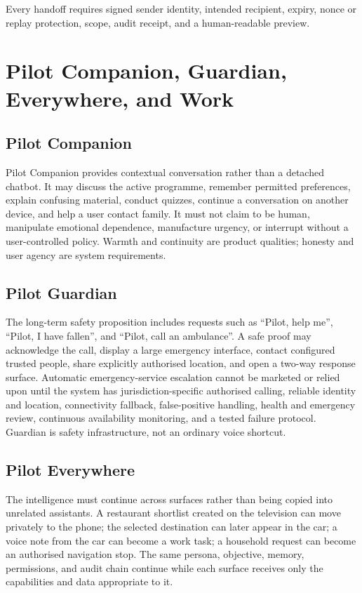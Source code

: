 \documentclass[11pt,a4paper]{article}
\begin{document}
Every handoff requires signed sender identity, intended recipient, expiry,
nonce or replay protection, scope, audit receipt, and a human-readable preview.

\section{Pilot Companion, Guardian, Everywhere, and Work}

\subsection{Pilot Companion}

Pilot Companion provides contextual conversation rather than a detached
chatbot.  It may discuss the active programme, remember permitted preferences,
explain confusing material, conduct quizzes, continue a conversation on
another device, and help a user contact family.  It must not claim to be human,
manipulate emotional dependence, manufacture urgency, or interrupt without a
user-controlled policy.  Warmth and continuity are product qualities; honesty
and user agency are system requirements.

\subsection{Pilot Guardian}

The long-term safety proposition includes requests such as ``Pilot, help me'',
``Pilot, I have fallen'', and ``Pilot, call an ambulance''.  A safe proof may
acknowledge the call, display a large emergency interface, contact configured
trusted people, share explicitly authorised location, and open a two-way
response surface.  Automatic emergency-service escalation cannot be marketed
or relied upon until the system has jurisdiction-specific authorised calling,
reliable identity and location, connectivity fallback, false-positive
handling, health and emergency review, continuous availability monitoring,
and a tested failure protocol.  Guardian is safety infrastructure, not an
ordinary voice shortcut.

\subsection{Pilot Everywhere}

The intelligence must continue across surfaces rather than being copied into
unrelated assistants.  A restaurant shortlist created on the television can
move privately to the phone; the selected destination can later appear in the
car; a voice note from the car can become a work task; a household request can
become an authorised navigation stop.  The same persona, objective, memory,
permissions, and audit chain continue while each surface receives only the
capabilities and data appropriate to it.
\end{document}
